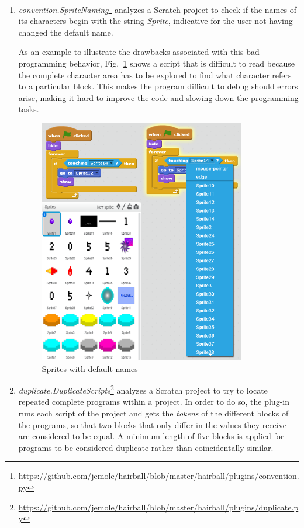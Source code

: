 \documentclass[conference]{format/IEEEtran}
\begin{document}
\begin{enumerate}

  \item \textit{convention.SpriteNaming}\footnote{\url{https://github.com/jemole/hairball/blob/master/hairball/plugins/convention.py}} analyzes a Scratch project to check if the names of its characters begin with the string \textit{Sprite}, indicative for the user not having changed the default name.

As an example to illustrate the drawbacks associated with this bad programming behavior, Fig.~\ref{fig:SpriteNaming} shows a script that is difficult to read because the complete character area has to be explored to find what character refers to a particular block. This makes the program difficult to debug should errors arise, making it hard to improve the code and slowing down the programming tasks. 

\begin{figure}
  \centering
    \includegraphics[width=9cm]{img/SpriteNaming.png}
  \caption{Sprites with default names}
  \label{fig:SpriteNaming}
\end{figure}

  \item \textit{duplicate.DuplicateScripts}\footnote{\url{https://github.com/jemole/hairball/blob/master/hairball/plugins/duplicate.py}} analyzes a Scratch project to try to locate repeated complete programs within a project. In order to do so, the plug-in runs each script of the project and gets the \textit{tokens} of the different blocks of the programs, so that two blocks that only differ in the values they receive are considered to be equal. A minimum length of five blocks is applied for programs to be considered duplicate rather than coincidentally similar.
  

\end{enumerate}
\end{document}
